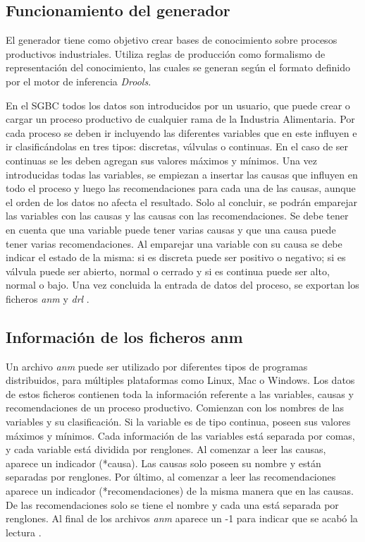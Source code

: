 \subsection{Funcionamiento del generador}
El generador tiene como objetivo crear bases de conocimiento sobre procesos productivos industriales. Utiliza reglas de producción como formalismo de representación del conocimiento, las cuales se generan según el formato definido por el motor de inferencia \textsl{Drools}.

En el SGBC todos los datos son introducidos por un usuario, que puede crear o cargar un proceso productivo de cualquier rama de la Industria Alimentaria. Por cada proceso se deben ir incluyendo las diferentes variables que en este influyen e ir clasificándolas en tres tipos: discretas, válvulas o continuas. En el caso de ser continuas se les deben agregan sus valores máximos y mínimos. Una vez introducidas todas las variables, se empiezan a insertar las causas que influyen en todo el proceso y luego las recomendaciones para cada una de las causas, aunque el orden de los datos no afecta el resultado. Solo al concluir, se podrán emparejar las variables con las causas y las causas con las recomendaciones. Se debe tener en cuenta que una variable puede tener varias causas y que una causa puede tener varias recomendaciones. Al emparejar una variable con su causa se debe indicar el estado de la misma: si es discreta puede ser positivo o negativo; si es válvula puede ser abierto, normal o cerrado y si es continua puede ser alto, normal o bajo. Una vez concluida la entrada de datos del proceso, se exportan los ficheros \textsl{anm} y \textsl{drl} \cite{Riveron2017}.

\subsection{Información de los ficheros anm}
Un archivo \textsl{anm} puede ser utilizado por diferentes tipos de programas distribuidos, para múltiples plataformas como Linux, Mac o Windows. Los datos de estos ficheros contienen toda la información referente a las variables, causas y recomendaciones de un proceso productivo.
Comienzan con los nombres de las variables y su clasificación. Si la variable es de tipo continua, poseen sus valores máximos y mínimos. Cada información de las variables está separada por comas, y cada variable está dividida por renglones.
Al comenzar a leer las causas, aparece un indicador (*causa). Las causas solo poseen su nombre y están separadas por renglones. Por último, al comenzar a leer las recomendaciones aparece un indicador (*recomendaciones) de la misma manera que en las causas.
De las recomendaciones solo se tiene el nombre y cada una está separada por renglones.
Al final de los archivos \textsl{anm} aparece un -1 para indicar que se acabó la lectura \cite{Riveron2017}.


